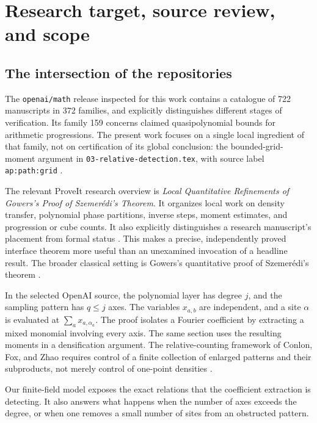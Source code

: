 \documentclass[11pt,a4paper]{article}
\numberwithin{equation}{section}
\theoremstyle{definition}
\theoremstyle{remark}
\newcommand{\1}{\mathbf 1}
\begin{document}
\newpage
\tableofcontents
\newpage

\section{Research target, source review, and scope}
\label{gm:sec:context}

\subsection{The intersection of the repositories}
The \texttt{openai/math} release inspected for this work contains a catalogue
of 722 manuscripts in 372 families, and explicitly distinguishes different
stages of verification. Its family 159 concerns claimed quasipolynomial
bounds for arithmetic progressions. The present work focuses on a single
local ingredient of that family, not on certification of its global
conclusion: the bounded-grid-moment argument in
\texttt{03-relative-detection.tex}, with source label
\texttt{ap:path:grid} \cite{oa,oa-grid}.

The relevant ProveIt research overview is
\emph{Local Quantitative Refinements of Gowers's Proof of Szemer\'edi's
Theorem}. It organizes local work on density transfer, polynomial phase
partitions, inverse steps, moment estimates, and progression or cube
counts. It also explicitly distinguishes a research manuscript's placement
from formal status \cite{proveit}. This makes a precise, independently
proved interface theorem more useful than an unexamined invocation of a
headline result. The broader classical setting is Gowers's quantitative
proof of Szemer\'edi's theorem \cite{gowers}.

In the selected OpenAI source, the polynomial layer has degree $j$, and the
sampling pattern has $q\leq j$ axes. The variables $x_{a,b}$ are independent,
and a site $\alpha$ is evaluated at $\sum_a x_{a,\alpha_a}$. The proof isolates
a Fourier coefficient by extracting a mixed monomial involving every
axis. The same section uses the resulting moments in a densification
argument. The relative-counting framework of Conlon, Fox, and Zhao requires
control of a finite collection of enlarged patterns and their subproducts,
not merely control of one-point densities \cite[\S\S2.2,6.2--6.3]{cfz}.

Our finite-field model exposes the exact relations that the coefficient
extraction is detecting. It also answers what happens when the number of
axes exceeds the degree, or when one removes a small number of sites from
an obstructed pattern.
\end{document}
